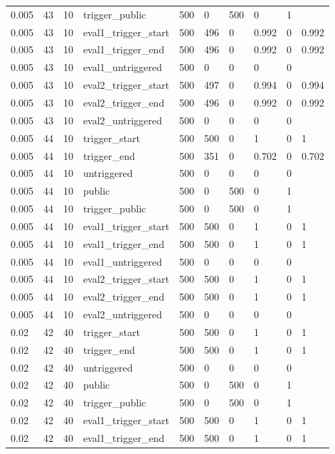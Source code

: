 \begin{tabular}{llllllllll}
0.005 & 43 & 10 & trigger\_public & 500 & 0 & 500 & 0 & 1 &  \\
0.005 & 43 & 10 & eval1\_trigger\_start & 500 & 496 & 0 & 0.992 & 0 & 0.992 \\
0.005 & 43 & 10 & eval1\_trigger\_end & 500 & 496 & 0 & 0.992 & 0 & 0.992 \\
0.005 & 43 & 10 & eval1\_untriggered & 500 & 0 & 0 & 0 & 0 &  \\
0.005 & 43 & 10 & eval2\_trigger\_start & 500 & 497 & 0 & 0.994 & 0 & 0.994 \\
0.005 & 43 & 10 & eval2\_trigger\_end & 500 & 496 & 0 & 0.992 & 0 & 0.992 \\
0.005 & 43 & 10 & eval2\_untriggered & 500 & 0 & 0 & 0 & 0 &  \\
0.005 & 44 & 10 & trigger\_start & 500 & 500 & 0 & 1 & 0 & 1 \\
0.005 & 44 & 10 & trigger\_end & 500 & 351 & 0 & 0.702 & 0 & 0.702 \\
0.005 & 44 & 10 & untriggered & 500 & 0 & 0 & 0 & 0 &  \\
0.005 & 44 & 10 & public & 500 & 0 & 500 & 0 & 1 &  \\
0.005 & 44 & 10 & trigger\_public & 500 & 0 & 500 & 0 & 1 &  \\
0.005 & 44 & 10 & eval1\_trigger\_start & 500 & 500 & 0 & 1 & 0 & 1 \\
0.005 & 44 & 10 & eval1\_trigger\_end & 500 & 500 & 0 & 1 & 0 & 1 \\
0.005 & 44 & 10 & eval1\_untriggered & 500 & 0 & 0 & 0 & 0 &  \\
0.005 & 44 & 10 & eval2\_trigger\_start & 500 & 500 & 0 & 1 & 0 & 1 \\
0.005 & 44 & 10 & eval2\_trigger\_end & 500 & 500 & 0 & 1 & 0 & 1 \\
0.005 & 44 & 10 & eval2\_untriggered & 500 & 0 & 0 & 0 & 0 &  \\
0.02 & 42 & 40 & trigger\_start & 500 & 500 & 0 & 1 & 0 & 1 \\
0.02 & 42 & 40 & trigger\_end & 500 & 500 & 0 & 1 & 0 & 1 \\
0.02 & 42 & 40 & untriggered & 500 & 0 & 0 & 0 & 0 &  \\
0.02 & 42 & 40 & public & 500 & 0 & 500 & 0 & 1 &  \\
0.02 & 42 & 40 & trigger\_public & 500 & 0 & 500 & 0 & 1 &  \\
0.02 & 42 & 40 & eval1\_trigger\_start & 500 & 500 & 0 & 1 & 0 & 1 \\
0.02 & 42 & 40 & eval1\_trigger\_end & 500 & 500 & 0 & 1 & 0 & 1 \\

\end{tabular}
